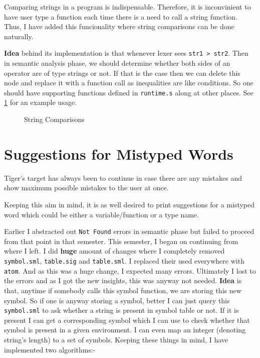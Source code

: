 Comparing strings in  a program is indispensable. Therefore, it is inconvinient to have user type a function each time there is a need to call a string function. Thus, I have added this funcionality where string comparisons can be done naturally. 

\textbf{Idea} behind its implementation is that whenever lexer sees \texttt{str1 > str2}. Then in semantic analysis phase, we should determine whether both sides of an operator are of type strings or not. If that is the case then we can delete this node and replace it with a function call as inequalities are like conditions. So one should have supporting functions defined in \texttt{runtime.s} along at other places. See \ref{fig:sc} for an example usage.

\begin{figure}
\centering
{}
\caption{String Comparisons}
\label{fig:sc}
\end{figure}

\section{Suggestions for Mistyped Words}

Tiger's target has always been to continue in case there are any mistakes and show maximum possible mistakes to the user at once. 

Keeping this aim in mind, it is as well desired to print suggestions for a mistyped word which could be either a variable/function or a type name. 

Earlier I abstracted out \texttt{Not Found} errors in semantic phase but failed to proceed from that point in that semester. This semester, I began on continuing from where I left. I did \textbf{huge} amount of changes where I completely removed \texttt{symbol.sml}, \texttt{table.sig} and \texttt{table.sml}. I replaced their used everywhere with \texttt{atom}. And as this was a huge change, I expected many errors. Ultimately I lost to the errors and as I got the new insights, this was anyway not needed. \textbf{Idea} is that, anytime if somebody calls this symbol function, we are storing this new symbol. So if one is anyway storing a symbol, better I can just query this \texttt{symbol.sml} to ask whether a string is present in symbol table or not. If it is present I can get a corresponding symbol which I can use to check whether that symbol is present in a given environment. I can even map an integer (denoting string's length) to a set of symbols. Keeping these things in mind, I have implemented two algorithms:-

